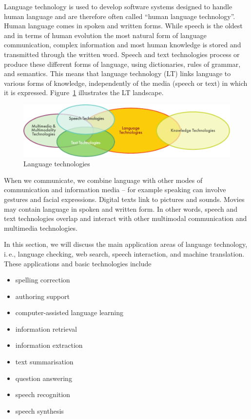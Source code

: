 \clearpage


\begin{multicols}{2}
Language technology is used to develop software systems designed to handle human language and are therefore often called “human language technology”. Human language comes in spoken and written forms. While speech is the oldest and in terms of human evolution the most natural form of language communication, complex information and most human knowledge is stored and transmitted through the written word. Speech and text technologies process or produce these different forms of language, using dictionaries, rules of grammar, and semantics. This means that language technology (LT) links language to various forms of knowledge, independently of the media (speech or text) in which it is expressed. Figure~\ref{fig:ltincontext_en} illustrates the LT landscape.

\begin{figure}[htb]
  \center
  \includegraphics[width=\textwidth]{../_media/english/language_technologies}
  \caption{Language technologies}
\label{fig:ltincontext_en}
\end{figure}

When we communicate, we combine language with other modes of
communication and information media – for example speaking can involve
gestures and facial expressions. Digital texts link to pictures and
sounds. Movies may contain language in spoken and written form. In
other words, speech and text technologies overlap and interact with
other multimodal communication and multimedia technologies.
 
In this section, we will discuss the main application areas of
language technology, i.\,e., language checking, web search, speech
interaction, and machine translation. These applications and basic
technologies include

\begin{itemize}
\item spelling correction
\item authoring support
\item computer-assisted language learning
\item information retrieval 
\item information extraction
\item text summarisation
\item question answering
\item speech recognition 
\item speech synthesis 
\end{itemize}


\end{multicols}
